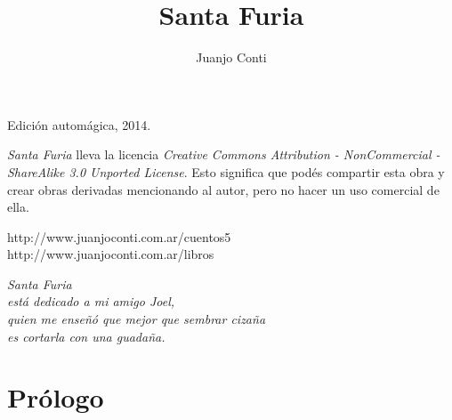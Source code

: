 \documentclass[12pt,twoside,openright,a5paper]{book}
\title{Santa Furia}
\author{Juanjo Conti}
\date{}
\begin{document}
\pagestyle{plain}

\maketitle


\thispagestyle{empty}
\noindent
Edición automágica, 2014.\\

\vspace{0.5cm}

\noindent
\emph{Santa Furia} lleva la licencia 
\emph{Creative Commons Attribution - NonCommercial - ShareAlike 3.0 Unported License}.
Esto significa que podés compartir esta obra y crear obras derivadas
mencionando al autor, pero no ha\-cer un uso comercial de ella.

\vfill

\noindent
http://www.juanjoconti.com.ar/cuentos5\\

\noindent
http://www.juanjoconti.com.ar/libros

\cleardoublepage

\noindent
\begin{flushright}
\emph{
\emph{Santa Furia}\\
está dedicado a mi amigo Joel,\\
quien me enseñó que mejor que sembrar cizaña\\
es cortarla con una guadaña.
}
\end{flushright}

\cleardoublepage

\renewcommand*\contentsname{Índice}

\tableofcontents

\chapter*{Prólogo}

\end{document}
